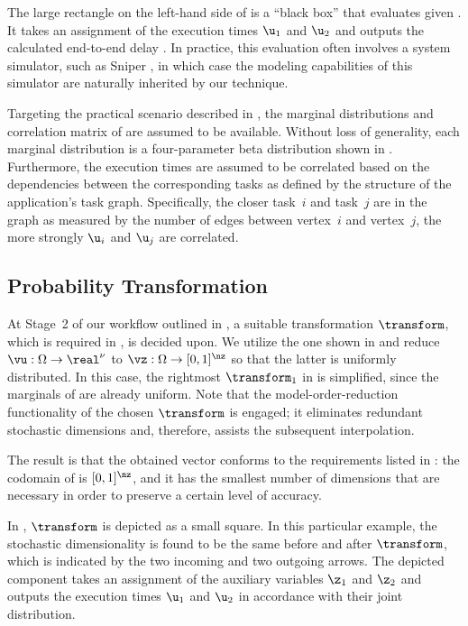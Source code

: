 The large rectangle on the left-hand side of  is a
``black box'' that evaluates \g given \vu. It takes an assignment of the
execution times $\u_1$ and $\u_2$ and outputs the calculated end-to-end delay
\g. In practice, this evaluation often involves a system simulator, such as
Sniper \cite{carlson2011}, in which case the modeling capabilities of this
simulator are naturally inherited by our technique.

Targeting the practical scenario described in , the
marginal distributions and correlation matrix of \vu are assumed to be
available. Without loss of generality, each marginal distribution is a
four-parameter beta distribution shown in . Furthermore,
the execution times are assumed to be correlated based on the dependencies
between the corresponding tasks as defined by the structure of the application's
task graph. Specifically, the closer task~$i$ and task~$j$ are in the graph as
measured by the number of edges between vertex~$i$ and vertex~$j$, the more
strongly $\u_i$ and $\u_j$ are correlated.

\subsection{Probability Transformation}

At Stage~2 of our workflow outlined in , a suitable
transformation $\transform$, which is required in ,
is decided upon. We utilize the one shown in 
and reduce $\vu: \Omega \to \real^\nu$ to $\vz: \Omega \to [0, 1]^\nz$ so that
the latter is uniformly distributed. In this case, the rightmost $\transform_1$
in  is simplified, since the marginals of \vz
are already uniform. Note that the model-order-reduction functionality of the
chosen $\transform$ is engaged; it eliminates redundant stochastic dimensions
and, therefore, assists the subsequent interpolation.

The result is that the obtained vector \vz conforms to the requirements listed
in : the codomain of \vz is $[0, 1]^\nz$, and it has
the smallest number of dimensions that are necessary in order to preserve a
certain level of accuracy.

In , $\transform$ is depicted as a small square. In this
particular example, the stochastic dimensionality is found to be the same before
and after $\transform$, which is indicated by the two incoming and two outgoing
arrows. The depicted component takes an assignment of the auxiliary variables
$\z_1$ and $\z_2$ and outputs the execution times $\u_1$ and $\u_2$ in
accordance with their joint distribution.


